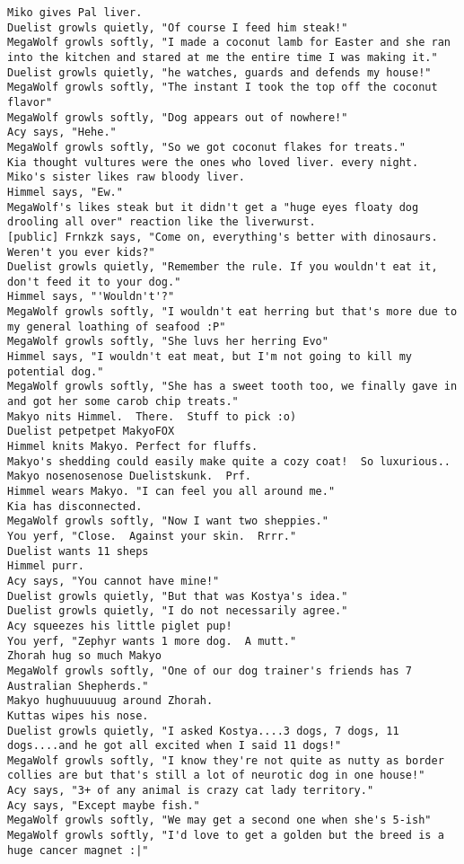 \begin{verbatim}
Miko gives Pal liver.
Duelist growls quietly, "Of course I feed him steak!"
MegaWolf growls softly, "I made a coconut lamb for Easter and she ran into the kitchen and stared at me the entire time I was making it."
Duelist growls quietly, "he watches, guards and defends my house!"
MegaWolf growls softly, "The instant I took the top off the coconut flavor"
MegaWolf growls softly, "Dog appears out of nowhere!"
Acy says, "Hehe."
MegaWolf growls softly, "So we got coconut flakes for treats."
Kia thought vultures were the ones who loved liver. every night.
Miko's sister likes raw bloody liver.
Himmel says, "Ew."
MegaWolf's likes steak but it didn't get a "huge eyes floaty dog drooling all over" reaction like the liverwurst.
[public] Frnkzk says, "Come on, everything's better with dinosaurs. Weren't you ever kids?"
Duelist growls quietly, "Remember the rule. If you wouldn't eat it, don't feed it to your dog."
Himmel says, "'Wouldn't'?"
MegaWolf growls softly, "I wouldn't eat herring but that's more due to my general loathing of seafood :P"
MegaWolf growls softly, "She luvs her herring Evo"
Himmel says, "I wouldn't eat meat, but I'm not going to kill my potential dog."
MegaWolf growls softly, "She has a sweet tooth too, we finally gave in and got her some carob chip treats."
Makyo nits Himmel.  There.  Stuff to pick :o)
Duelist petpetpet MakyoFOX
Himmel knits Makyo. Perfect for fluffs.
Makyo's shedding could easily make quite a cozy coat!  So luxurious..
Makyo nosenosenose Duelistskunk.  Prf.
Himmel wears Makyo. "I can feel you all around me."
Kia has disconnected.
MegaWolf growls softly, "Now I want two sheppies."
You yerf, "Close.  Against your skin.  Rrrr."
Duelist wants 11 sheps
Himmel purr.
Acy says, "You cannot have mine!"
Duelist growls quietly, "But that was Kostya's idea."
Duelist growls quietly, "I do not necessarily agree."
Acy squeezes his little piglet pup!
You yerf, "Zephyr wants 1 more dog.  A mutt."
Zhorah hug so much Makyo
MegaWolf growls softly, "One of our dog trainer's friends has 7 Australian Shepherds."
Makyo hughuuuuuug around Zhorah.
Kuttas wipes his nose.
Duelist growls quietly, "I asked Kostya....3 dogs, 7 dogs, 11 dogs....and he got all excited when I said 11 dogs!"
MegaWolf growls softly, "I know they're not quite as nutty as border collies are but that's still a lot of neurotic dog in one house!"
Acy says, "3+ of any animal is crazy cat lady territory."
Acy says, "Except maybe fish."
MegaWolf growls softly, "We may get a second one when she's 5-ish"
MegaWolf growls softly, "I'd love to get a golden but the breed is a huge cancer magnet :|"

\end{verbatim}
